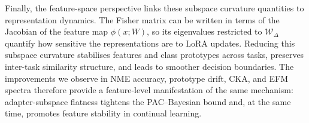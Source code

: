 \documentclass[10pt]{article} %
\begin{document}
Finally, the feature-space perspective links these subspace curvature quantities to representation dynamics. The Fisher matrix can be written in terms of the Jacobian of the feature map $\phi(x;W)$, so its eigenvalues restricted to $\mathcal W_\Delta$ quantify how sensitive the representations are to LoRA updates. Reducing this subspace curvature stabilises features and class prototypes across tasks, preserves inter-task similarity structure, and leads to smoother decision boundaries. The improvements we observe in NME accuracy, prototype drift, CKA, and EFM spectra therefore provide a feature-level manifestation of the same mechanism: adapter-subspace flatness tightens the PAC–Bayesian bound and, at the same time, promotes feature stability in continual learning.














\end{document}
